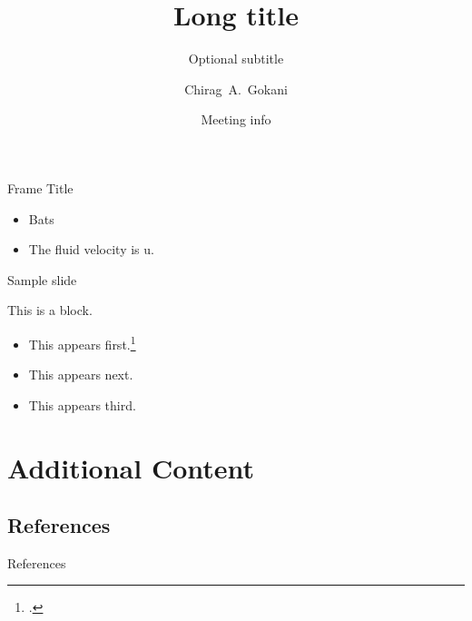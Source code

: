 \documentclass[10pt, handout]{beamer} %
\title[Short title]{Long title}
\subtitle{Optional subtitle} %
\author[\href{mailto:chiragokani@utexas.edu}{chiragokani@utexas.edu}]{
Chirag~A.~Gokani%
}
\institute[ARL:UT] %
{
  \inst{}%
Applied Research Laboratories \& Walker Department of Mechanical Engineering\\University of Texas at Austin
}
\date[\today]{Meeting info}
\renewcommand{\vec}[1]{\boldsymbol{\mathrm{{#1}}}} %
\begin{document}
\begin{frame}[plain]
    \maketitle
\end{frame}

\begin{frame}{Frame Title}
\begin{itemize}
\item<1->Bats
\item<2->The fluid velocity is \(\vec{u}\).
\end{itemize}
\end{frame}

\begin{frame}{Sample slide}
\begin{example}This is a block.\end{example}

\begin{itemize}
\item<1->This appears first.\footcite[p.~1]{blackstock2000fundamentals}
\item<2->This appears next.
\item<3->This appears third.
\end{itemize}
\end{frame}

\appendix
\section*{Additional Content}

\subsection*{References}
\begin{frame}[allowframebreaks]{References}
\printbibliography
\end{frame}
\end{document}
